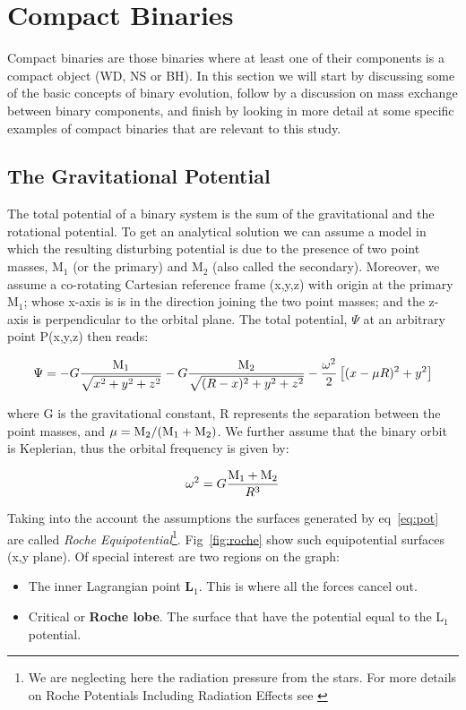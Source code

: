 \section[Compact Binaries]{Compact Binaries}\label{sec:cb}

Compact binaries are those binaries where at least one of their components is a compact object (WD, NS or BH). In this section we will start by discussing some of the basic concepts of binary evolution, follow by a discussion on mass exchange between binary components,  and finish by looking in more detail at some specific examples of compact binaries that are relevant to this study.   


\subsection{The Gravitational Potential}

The total potential of a binary system is the sum of the gravitational and the rotational potential. To get an analytical solution we can assume a model in which the resulting disturbing potential is due to the presence of two point masses, M$_1$ (or the primary) and M$_2$ (also called the secondary). Moreover, we assume a co-rotating Cartesian reference frame (x,y,z) with origin at the primary M$_1$; whose x-axis is is in the direction joining the two point masses; and the z-axis is perpendicular to the orbital plane. The total potential, $\Psi$ at an arbitrary point P(x,y,z) then reads:

\begin{equation}
        \Psi = - G \frac{\text M _1}{\sqrt{x^2+y^2+z^2}} - G \frac{\text M _2 }{\sqrt{(R - x)^2 + y^2 + z^2}} - \frac{\omega^2 }{2}  \left [ (x- \mu R )^2  + y^2 \right ]    
        \label{eq:pot}
\end{equation}

where G is the gravitational constant, R represents the separation between the point masses, and $\mu = \text M _2/(\text M _1 + \text M _2)$. We further assume that the binary orbit is Keplerian, thus the orbital frequency is given by:

\begin{equation}
        \omega ^2 = G \frac{\text M _1 + \text M _2}{R^3}
        \label{eq:roche}
\end{equation}

Taking into the account the assumptions the surfaces generated by eq~\ref{eq:pot} are called \emph{Roche Equipotential}\footnote{We are neglecting here the radiation pressure from the stars. For more details on Roche Potentials Including Radiation Effects see \cite{schuerman_roche_1972}}. Fig~\ref{fig:roche} show such equipotential surfaces (x,y plane). Of special interest are two regions on the graph:
\begin{itemize}
        \item The inner Lagrangian point \textbf{L$_1$}. This is where all the forces cancel out. 
        \item Critical or \textbf{Roche lobe}. The surface that have the potential equal to the L$_1$ potential. 
\end{itemize}

